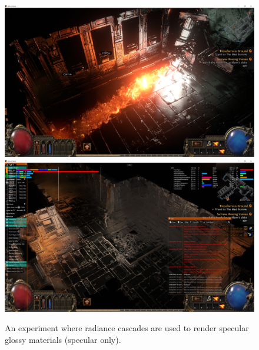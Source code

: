 \documentclass{jcgt}
\begin{document}
\begin{figure}[htb]
  \centering
  \includegraphics[width=\columnwidth]{images/poe2_reflections_1.png}
  \includegraphics[width=\columnwidth]{images/poe2_reflections_2.png}
  \caption{\label{fig:poe_specular}
     An experiment where radiance cascades are used to render specular glossy materials (specular only).}
\end{figure}
\end{document}
